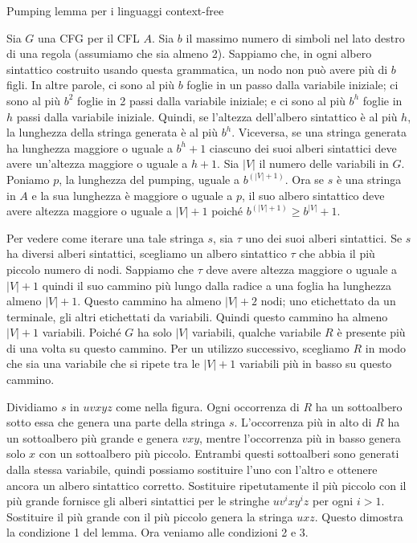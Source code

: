 \begin{Thm}{Pumping lemma per i linguaggi context-free}{}
\begin{demonstration}
Sia $G$ una CFG per il CFL $A$. Sia $b$ il massimo numero di simboli nel lato destro di una regola (assumiamo che sia almeno 2). Sappiamo che, in ogni albero sintattico costruito usando questa grammatica, un nodo non può avere più di $b$ figli. In altre parole, ci sono al più $b$ foglie in un passo dalla variabile iniziale; ci sono al più $b ^ 2$ foglie in 2 passi dalla variabile iniziale; e ci sono al più $b ^ h$ foglie in $h$ passi dalla variabile iniziale. Quindi, se l'altezza dell'albero sintattico è al più $h$, la lunghezza della stringa generata è al più $b ^ h$. Viceversa, se una stringa generata ha lunghezza maggiore o uguale a $b ^ h + 1$ ciascuno dei suoi alberi sintattici deve avere un'altezza maggiore o uguale a $h + 1$. Sia $|V|$ il numero delle variabili in $G$. Poniamo $p$, la lunghezza del pumping, uguale a $b^{(|V| + 1)}$. Ora se $s$ è una stringa in $A$ e la sua lunghezza è maggiore o uguale a $p$, il suo albero sintattico deve avere altezza maggiore o uguale a $|V| + 1$ poiché $b^{(|V| + 1)}\geq b^{|V|} + 1$.

Per vedere come iterare una tale stringa $s$, sia $\tau$ uno dei suoi alberi sintattici. Se $s$ ha diversi alberi sintattici, scegliamo un albero sintattico $\tau$ che abbia il più piccolo numero di nodi. Sappiamo che $\tau$ deve avere altezza maggiore o uguale a $|V| + 1$ quindi il suo cammino più lungo dalla radice a una foglia ha lunghezza almeno $|V| + 1$. Questo cammino ha almeno $|V| + 2$ nodi; uno etichettato da un terminale, gli altri etichettati da variabili. Quindi questo cammino ha almeno $|V| + 1$ variabili. Poiché $G$ ha solo $|V|$ variabili, qualche variabile $R$ è presente più di una volta su questo cammino. Per un utilizzo successivo, scegliamo $R$ in modo che sia una variabile che si ripete tra le $|V| + 1$ variabili più in basso su questo cammino.

Dividiamo $s$ in $uvxyz$ come nella figura. Ogni occorrenza di $R$ ha un sottoalbero sotto essa che genera una parte della stringa $s$. L'occorrenza più in alto di $R$ ha un sottoalbero più grande e genera $vxy$, mentre l'occorrenza più in basso genera solo $x$ con un sottoalbero più piccolo. Entrambi questi sottoalberi sono generati dalla stessa variabile, quindi possiamo sostituire l'uno con l'altro e ottenere ancora un albero sintattico corretto. Sostituire ripetutamente il più piccolo con il più grande fornisce gli alberi sintattici per le stringhe $uv^ixy^iz$ per ogni $i > 1$. Sostituire il più grande con il più piccolo genera la stringa $uxz$. Questo dimostra la condizione 1 del lemma. Ora veniamo alle condizioni 2 e 3.


\end{demonstration}
\end{Thm}
